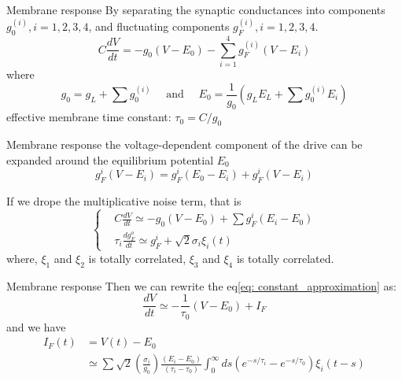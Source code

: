 \documentclass{beamer}
\begin{document}
\begin{frame}{Membrane response}
	By separating the synaptic conductances into components $ g_{0}^{(i)}, i=1,2,3,4 $, and fluctuating components $ g_{F}^{(i)},i=1, 2, 3, 4 $.
	\begin{equation}
		C \frac{d V}{d t}=-g_{0}\left(V-E_{0}\right)-\sum_{i=1}^{4}g_{F}^{(i)}\left(V-E_{i}\right)
	\end{equation}
	where
	\begin{equation}
		g_{0}=g_{L}+\sum g_{0}^{(i)} \quad \text { and } \quad E_{0}=\frac{1}{g_{0}}\left(g_{L} E_{L}+\sum g_{0}^{(i)} E_{i}\right)
	\end{equation}
	effective membrane time constant: $ \tau_{0} = C /g_{0} $
\end{frame}
\begin{frame}{Membrane response}
	the voltage-dependent component of the drive can be expanded around the equilibrium potential $ E_{0} $
	\begin{equation}
		g_{F}^{i}\left(V-E_{i}\right)=g_{F}^{i}\left(E_{0}-E_{i}\right)+g_{F}^{i}\left(V-E_{i}\right)
	\end{equation}
	\par
	If we drope the multiplicative noise term, that is
	\begin{equation}
		\label{eq: constant_approximation}
		\left\{
		\begin{aligned}	
		&C \frac{d V}{d t} \simeq-g_{0}\left(V-E_{0}\right)+\sum g_{F}^{i}\left(E_{i}-E_{0}\right) \\
		&\tau_{i} \frac{d g_{F}^{o}}{d t} \simeq g_{F}^{i}+\sqrt{2} \sigma_{i} \xi_{i}(t)
	\end{aligned}
	\right .
	\end{equation}
	where, $ \xi_{1} $ and $ \xi_{2} $ is totally correlated, $ \xi_{3} $ and $ \xi_{4} $ is totally correlated.
\end{frame}
\begin{frame}{Membrane response}
	Then we can rewrite the eq\ref{eq: constant_approximation} as:
	\begin{equation}
		\dfrac{dV}{dt} \simeq -\dfrac{1}{\tau_{0}}\left(V - E_{0}\right) + I_{F}
	\end{equation}
	and we have
	\begin{equation}
		\begin{aligned}
			I_{F}(t)  &= V(t)-E_{0} \\
			 &\simeq \sum \sqrt{2}\left(\frac{\sigma_{i}}{g_{0}}\right) \frac{\left(E_{i}-E_{0}\right)}{\left(\tau_{i}-\tau_{0}\right)} \int_{0}^{\infty} d s\left(e^{-s / \tau_{i}}-e^{-s / \tau_{0}}\right) \xi_{i}(t-s)
		\end{aligned}
	\end{equation}
\end{frame}
\end{document}
